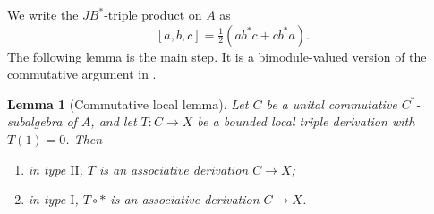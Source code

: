 \documentclass[11pt]{article}
\newtheorem{lemma}[theorem]{Lemma}
\newcommand{\I}{\mathrm I}
\newcommand{\II}{\mathrm{II}}
\begin{document}
We write the $JB^*$-triple product on $A$ as
\[
 [a,b,c]=\tfrac12(ab^*c+cb^*a).
\]
The following lemma is the main step.  It is a bimodule-valued version of the
commutative argument in \cite{BFGP,NM}.

\begin{lemma}[Commutative local lemma]
\label{lem:comm}
Let $C$ be a unital commutative $C^*$-subalgebra of $A$, and let
$T:C\to X$ be a bounded local triple derivation with $T(1)=0$.
Then
\begin{enumerate}
\item in type $\II$, $T$ is an associative derivation $C\to X$;
\item in type $\I$, $T\circ *$ is an associative derivation $C\to X$.
\end{enumerate}
\end{lemma}
\end{document}
